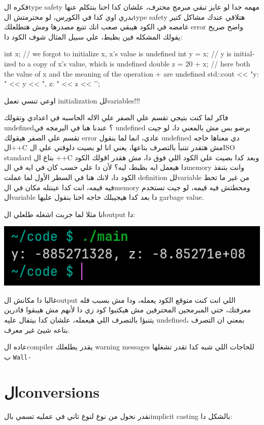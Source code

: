 \documentclass[11pt]{article}
\let\OriginalVerbatim\verbatim
\let\endOriginalVerbatim\endverbatim
\renewenvironment{verbatim}{\begin{english}\OriginalVerbatim}{\endOriginalVerbatim\end{english}}
\begin{document}
فكره الtype safety مهمه جدا لو عايز تبقي مبرمج محترف، علشان كدا احنا بنتكلم عنها بدري اوي كدا في الكورس، لو محترمتش الtype safety هتلاقي عندك مشاكل كتير غامضه في الكود هيبقي صعب انك تتبع مصدرها ومش هتطلعلك error واضح صريح يقولك المشكله فين بظبط، علي سبيل المثال شوف الكود دا:

\begin{verbatim}
int x;		// we forgot to initialize x, x's value is undefined
int y = x;          // y is initialized to a copy of x's value, which is undefined
double z = 20 + x;  // here both the value of x and the meaning of the operation + are undefined
std::cout << "y: " << y << ", z: " << z << '\n';
\end{verbatim}

اوعي تنسي تعمل initialization للvariables!!!

فاكر لما كنت بتيجي تقسم علي الصفر علي الاله الحاسبه في اعدادي وتقولك undefined؟ عندنا هنا في البرمجه في undefined برضو بس مش بالمعني دا، لو جيت تقسم علي الصفر هيقولك error عادي، انما لما بنقول undefined دي معناها حاجه ال++C مش هتقدر تتنبأ بالتصرف بتاعها، يعني انا لو بصيت دلوقتي علي الISO standard بتاع ال ++C وبعد كدا بصيت علي الكود اللي فوق دا، مش هقدر اقولك الكود دا هيعمل ايه بظبط، ليه؟ لأن دا علي حسب كان في ايه في الmemory وانت بتنفذ الكود دا، لانك هنا في السطر الأول لما عملت definition للvariable من غير ما تحط فيه قيمه، انت كدا عينتله مكان في الmemory ومحطتش فيه قيمه، لو جيت تستخدم الvariable دا بعد كدا هيجيبلك حاجه احنا بنقول عليها garbage value.

انا مثلا لما جربت اشغله طلعلي الoutput دا:

\begin{center}
\includegraphics[width=.9\linewidth]{../images/type_safety.png}
\end{center}

غالبا دا مكانش الoutput اللي انت كنت متوقع الكود يعمله، ودا مش بسبب قله معرفتك، حتي المبرمجين المحترفين مش هيكتبوا كود زي دا لأنهم مش هيبقوا قادرين يتنبؤا بالتصرف اللي هيعمله، علشان كدا بيتقال عليه undefined، بمعني ان التصرف بتاعه شيئ غير معرف.

عاده الcompiler يقدر يطلعلك warning messages للحاجات اللي شبه كدا تقدر تشغلها ب \texttt{Wall-} 
\section{الconversions}
\label{sec:org95adcc0}
نقدر نحول من نوع لنوع تاني في عمليه تسمي بالimplicit casting بالشكل دا:
\end{document}
